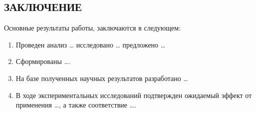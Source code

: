 
\begin{singlespace}
  \chapter*{\MakeUppercase{Заключение}}
\end{singlespace}


Основные результаты работы, заключаются в следующем:

\begin{enumerate}
\item Проведен анализ \dots{} исследовано \dots{} предложено \dots{}
\item Сформированы \dots{}.
\item На базе полученных научных результатов разработано \dots{}
\item В ходе экспериментальных исследований подтвержден ожидаемый
  эффект от применения \dots{}, а также соответствие \dots{}.
\end{enumerate}

